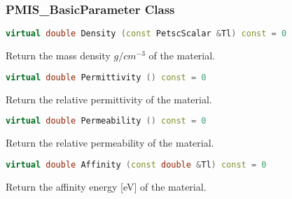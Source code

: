 \documentclass[oneside,12pt]{cgd_book}
\begin{document}
\subsubsection{PMIS\_BasicParameter Class}
\label{sec:Extend:PMI:Ref:PMIS:Basic}
\begin{lstlisting}[language={C++}]
virtual double Density (const PetscScalar &Tl) const = 0
\end{lstlisting}
Return the mass density $g/cm^{-3}$ of the material.
\par
\begin{lstlisting}[language={C++}]
virtual double Permittivity () const = 0
\end{lstlisting}
Return the relative permittivity of the material.
\par
\begin{lstlisting}[language={C++}]
virtual double Permeability () const = 0
\end{lstlisting}
Return the relative permeability of the material.
\par
\begin{lstlisting}[language={C++}]
virtual double Affinity (const double &Tl) const = 0
\end{lstlisting}
Return the affinity energy [eV] of the material.
\par
\par
\end{document}
